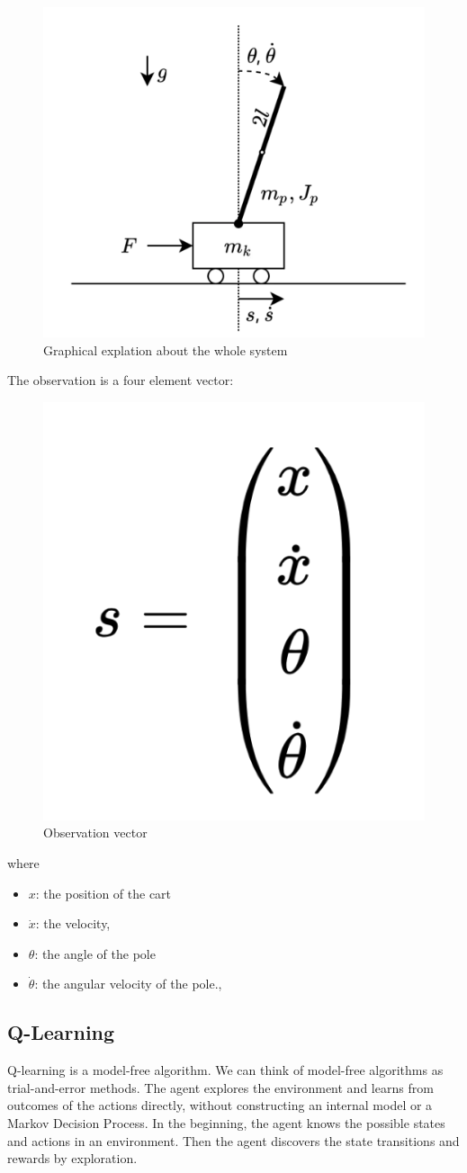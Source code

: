 \documentclass{article}
\begin{document}
\begin{figure}[h]
	\centering
	\includegraphics[width=0.5\linewidth]{../data/images/cart.png}
	\caption{Graphical explation about the whole system}
	\label{fig:plot1}
\end{figure}

\newpage

The observation is a four element vector: 
\begin{figure}[h]
	\centering
	\includegraphics[width=0.2\linewidth]{../data/images/vector.png}
	\caption{Observation vector}
	\label{fig:plot1}
\end{figure}

where 
\begin{itemize}
	\item $x$: the position of the cart
	\item $\dot{x}$: the velocity, 
	\item $\theta$:  the angle of the pole
	\item $\dot{\theta}$: the angular velocity of the pole., 	
\end{itemize}

\subsection{Q-Learning}
Q-learning is a model-free algorithm. We can think of model-free algorithms as trial-and-error methods. The agent explores the environment and learns from outcomes of the actions directly, without constructing an internal model or a Markov Decision Process.
In the beginning, the agent knows the possible states and actions in an environment. Then the agent discovers the state transitions and rewards by exploration.
\end{document}
